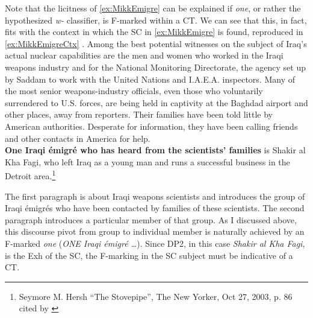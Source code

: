 \documentclass[letterpaper]{article}
\begin{document}
Note that the licitness of \ref{ex:MikkEmigre} can be explained if \textit{one}, or rather the hypothesized \textit{w-} classifier, is F-marked within a CT.
We can see that this, in fact, fits with the context in which the SC in \ref{ex:MikkEmigre} is found, reproduced in \ref{ex:MikkEmigreCtx}
\ex.\label{ex:MikkEmigreCtx} {
	Among the best potential witnesses on the subject of Iraq’s actual nuclear capabilities are the men and women who worked in the Iraqi weapons industry and for the National Monitoring Directorate, the agency set up by Saddam to work with the United Nations and I.A.E.A. inspectors.
	Many of the most senior weapons-industry officials, even those who voluntarily surrendered to U.S. forces, are being held in captivity at the Baghdad airport and other places, away from reporters. Their families have been told little by American authorities.
	Desperate for information, they have been calling friends and other contacts in America for help.\\
\hspace{2em}\textbf{One Iraqi \'emigr\'e who has heard from the scientists' families} is Shakir al Kha Fagi, who left Iraq as a young man and runs a successful business in the Detroit area.\footnote{Seymore M. Hersh ``The Stovepipe'', The New Yorker, Oct 27, 2003, p. 86 cited by \textcite[118]{mikkelsen2005copular}}}

The first paragraph is about Iraqi weapons scientists and introduces the group of Iraqi \'emigr\'es who have been contacted by families of these scientists.
The second paragraph introduces a particular member of that group.
As I discussed above, this discourse pivot from group to individual member is naturally achieved by an F-marked \textit{one} (\textit{ONE Iraqi \'emigr\'e \ldots}).
Since DP2, in this case \textit{Shakir al Kha Fagi}, is the Exh of the SC, the F-marking in the SC subject must be indicative of a CT.
\end{document}
